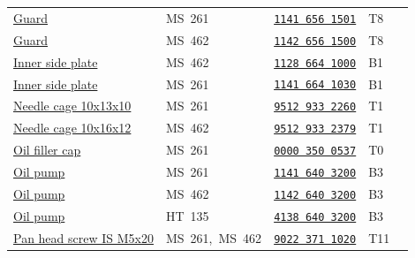 \documentclass[10pt,letterpaper]{article}
\begin{document}
\begin{longtable}{@{}>{\raggedright\arraybackslash}p{3.18in}p{1.85in}p{1.30in}p{0.38in}r@{}}
\rowcolor{black!6}\hyperlink{11416561501}{Guard} & \textcolor{frkApplication}{\mbox{MS 261}} & \hyperlink{11416561501}{\texttt{1141 656 1501}} & T8 & \pageref{part-11416561501}\\

\hyperlink{11426561500}{Guard} & \textcolor{frkApplication}{\mbox{MS 462}} & \hyperlink{11426561500}{\texttt{1142 656 1500}} & T8 & \pageref{part-11426561500}\\

\rowcolor{black!6}\hyperlink{11286641000}{Inner side plate} & \textcolor{frkApplication}{\mbox{MS 462}} & \hyperlink{11286641000}{\texttt{1128 664 1000}} & B1 & \pageref{part-11286641000}\\

\hyperlink{11416641030}{Inner side plate} & \textcolor{frkApplication}{\mbox{MS 261}} & \hyperlink{11416641030}{\texttt{1141 664 1030}} & B1 & \pageref{part-11416641030}\\

\rowcolor{black!6}\hyperlink{95129332260}{Needle cage 10x13x10} & \textcolor{frkApplication}{\mbox{MS 261}} & \hyperlink{95129332260}{\texttt{9512 933 2260}} & T1 & \pageref{part-95129332260}\\

\hyperlink{95129332379}{Needle cage 10x16x12} & \textcolor{frkApplication}{\mbox{MS 462}} & \hyperlink{95129332379}{\texttt{9512 933 2379}} & T1 & \pageref{part-95129332379}\\

\rowcolor{black!6}\hyperlink{00003500537}{Oil filler cap} & \textcolor{frkApplication}{\mbox{MS 261}} & \hyperlink{00003500537}{\texttt{0000 350 0537}} & T0 & \pageref{part-00003500537}\\

\hyperlink{11416403200}{Oil pump} & \textcolor{frkApplication}{\mbox{MS 261}} & \hyperlink{11416403200}{\texttt{1141 640 3200}} & B3 & \pageref{part-11416403200}\\

\rowcolor{black!6}\hyperlink{11426403200}{Oil pump} & \textcolor{frkApplication}{\mbox{MS 462}} & \hyperlink{11426403200}{\texttt{1142 640 3200}} & B3 & \pageref{part-11426403200}\\

\hyperlink{41386403200}{Oil pump} & \textcolor{frkApplication}{\mbox{HT 135}} & \hyperlink{41386403200}{\texttt{4138 640 3200}} & B3 & \pageref{part-41386403200}\\

\rowcolor{black!6}\hyperlink{90223711020}{Pan head screw IS M5x20} & \textcolor{frkApplication}{\mbox{MS 261, MS 462}} & \hyperlink{90223711020}{\texttt{9022 371 1020}} & T11 & \pageref{part-90223711020}\\


\end{longtable}
\end{document}
